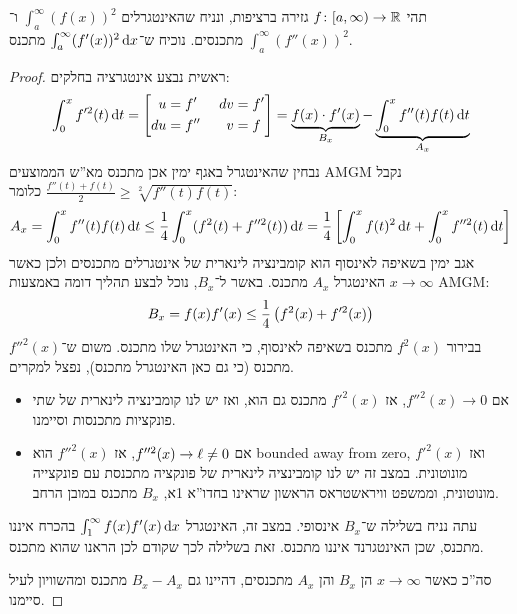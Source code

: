 \documentclass[]{../../../../tex/classes/homework}
\newcommand\udv[4]{\csb{\begin{aligned}
			u &= #1  \ & dv &= #2 \\
			du &= #3 \ & v &= #4
\end{aligned}}}
\begin{document}
	\section{}
	תהי $f \colon [a, \infty) \to \mathbb{R}$ גזירה ברציפות, ונניח שהאינטגרלים $\int^{\infty}_a(f(x))^{2}$ ו־$\int^{\infty}_a(f''(x))^{2}$ מתכנסים. נוכיח ש־$\int^{\infty}_a (f'(x))^{2}\,\mathrm{d}x$ מתכנס. 
	\begin{proof}
		ראשית נבצע אינטגרציה בחלקים: 
		\[ \int^{x}_0 f'^{2}(t)\dt = \udv{f'}{f'}{f''}{f} = \underbrace{f(x) \cdot f'(x)}_{B_x} - \underbrace{\int^{x}_0 f''(t)f(t) \dt}_{A_x} \]
		נבחין שהאינטגרל באגף ימין אכן מתכנס מא''ש הממוצעים AMGM נקבל $\frac{f''(t) + f(t)}{2} \ge \sqrt[2]{f''(t)f(t)}$ כלומר: 
		\[ A_x = \int^{x}_0 f''(t)f(t)\,\mathrm{d}t \le \frac{1}{4}\int^{x}_0(f^{2}(t) + f''^{2}(t))\,\mathrm{d}t = \frac{1}{4}\left [ \int^{x}_0 f(t)^{2}\,\mathrm{d}t + \int^{x}_0 f''^{2}(t)\,\mathrm{d}t \right ] \]
		אגב ימין בשאיפה לאינסוף הוא קומבינציה לינארית של אינטגרלים מתכנסים ולכן כאשר $x \to \infty$ האינטגרל $A_x$ מתכנס. 
		באשר ל־$B_x$, נוכל לבצע תהליך דומה באמצעות AMGM: 
		\[ B_x = f(x)f'(x) \le \frac{1}{4}\left ( f^2(x) + f'^2(x) \right ) \]
		בבירור $f^2(x)$ מתכנס בשאיפה לאינסוף, כי האינטגרל שלו מתכנס. משום ש־$f''^2(x)$ מתכנס (כי גם כאן האינטגרל מתכנס), נפצל למקרים. 
		\begin{itemize}
			\item אם $f''^{2}(x) \to 0$, אז $f'^2(x)$ מתכנס גם הוא, ואז יש לנו קומבינציה לינארית של שתי פונקציות מתכנסות וסיימנו. 
			\item אם $f''^{2}(x) \to \ell \neq 0$, אז $f''^{2}(x)$ הוא bounded away from zero, ואז $f'^{2}(x)$ מונוטונית. במצב זה יש לנו קומבינציה לינארית של פונקציה מתכנסת עם פונקצייה מונוטונית, וממשפט וויראשטראס הראשון שראינו בחדו''א 1א, $B_x$ מתכנס במובן הרחב. 
		\end{itemize}
		עתה נניח בשלילה ש־$B_x$ אינסופי. במצב זה, האינטגרל $\int^{\infty}_1 f(x) f'(x) \,\mathrm{d}x$ בהכרח איננו מתכנס, שכן האינטגרנד איננו מתכנס. זאת בשלילה לכך שקודם לכן הראנו שהוא מתכנס. 
		
		סה''כ כאשר $x \to \infty$ הן $B_x$ והן $A_x$ מתכנסים, דהיינו גם $B_x - A_x$ מתכנס ומהשוויון לעיל סיימנו. 
	\end{proof}
	
%			
	
\end{document}
